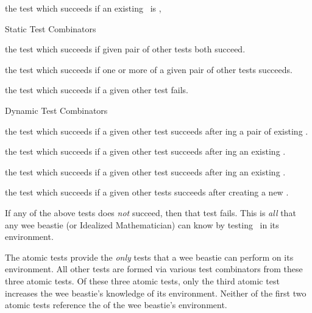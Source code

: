 \item the test which succeeds if an existing \lol\ is 
,

\stopitemize

\item Static Test Combinators

\startitemize[n]

\item the test which succeeds if given pair of other tests both succeed.

\item the test which succeeds if one or more of a given pair of other 
tests succeeds. 

\item the test which succeeds if a given other test fails.

\stopitemize

\item Dynamic Test Combinators

\startitemize[n]

\item the test which succeeds if a given other test succeeds after 
ing a pair of existing \lols.

\item the test which succeeds if a given other test succeeds after 
ing an existing \lol.


\item the test which succeeds if a given other test succeeds after 
ing an existing \lol.

\item the test which succeeds if a given other tests succeeds after 
creating a new  \lol.

\stopitemize

\stopitemize

If any of the above tests does \emph{not} succeed, then that test fails. 
This is \emph{all} that any wee beastie (or Idealized Mathematician) can 
know by testing \lols\ in its environment. 

\stopDefinition


\startMMundi

The atomic tests provide the \emph{only} tests that a wee beastie can 
perform \emph{} on its environment. All other tests are 
formed via various test combinators from these three atomic tests. Of 
these three atomic tests, only the third atomic test increases the wee 
beastie's knowledge of its environment. Neither of the first two atomic 
tests reference the  of the wee beastie's environment. 

